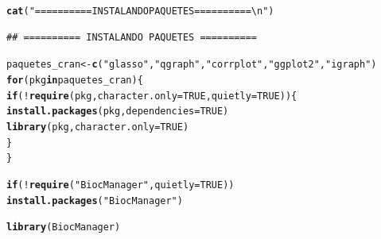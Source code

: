 \documentclass{article}\usepackage[]{graphicx}\usepackage[]{xcolor}
\makeatletter
\newcommand{\hlnum}[1]{\textcolor[rgb]{0.686,0.059,0.569}{#1}}%
\newcommand{\hlsng}[1]{\textcolor[rgb]{0.192,0.494,0.8}{#1}}%
\newcommand{\hlopt}[1]{\textcolor[rgb]{0,0,0}{#1}}%
\newcommand{\hldef}[1]{\textcolor[rgb]{0.345,0.345,0.345}{#1}}%
\newcommand{\hlkwa}[1]{\textcolor[rgb]{0.161,0.373,0.58}{\textbf{#1}}}%
\newcommand{\hlkwb}[1]{\textcolor[rgb]{0.69,0.353,0.396}{#1}}%
\newcommand{\hlkwc}[1]{\textcolor[rgb]{0.333,0.667,0.333}{#1}}%
\newcommand{\hlkwd}[1]{\textcolor[rgb]{0.737,0.353,0.396}{\textbf{#1}}}%
\newenvironment{kframe}{%
 \def\at@end@of@kframe{}%
 \ifinner\ifhmode%
  \def\at@end@of@kframe{\end{minipage}}%
  \begin{minipage}{\columnwidth}%
 \fi\fi%
 \def\FrameCommand##1{\hskip\@totalleftmargin \hskip-\fboxsep
 \colorbox{shadecolor}{##1}\hskip-\fboxsep
     \hskip-\linewidth \hskip-\@totalleftmargin \hskip\columnwidth}%
 \MakeFramed {\advance\hsize-\width
   \@totalleftmargin\z@ \linewidth\hsize
   \@setminipage}}%
 {\par\unskip\endMakeFramed%
 \at@end@of@kframe}
\newenvironment{knitrout}{}{} %
\makeatother
\begin{document}
\begin{knitrout}
\color{fgcolor}\begin{kframe}
\begin{alltt}
\hlkwd{cat}\hldef{(}\hlsng{"========== INSTALANDO PAQUETES ==========\textbackslash{}n"}\hldef{)}
\end{alltt}
\begin{verbatim}
## ========== INSTALANDO PAQUETES ==========
\end{verbatim}
\begin{alltt}
\hldef{paquetes_cran} \hlkwb{<-} \hlkwd{c}\hldef{(}\hlsng{"glasso"}\hldef{,} \hlsng{"qgraph"}\hldef{,} \hlsng{"corrplot"}\hldef{,} \hlsng{"ggplot2"}\hldef{,} \hlsng{"igraph"}\hldef{)}
\hlkwa{for}\hldef{(pkg} \hlkwa{in} \hldef{paquetes_cran) \{}
  \hlkwa{if}\hldef{(}\hlopt{!}\hlkwd{require}\hldef{(pkg,} \hlkwc{character.only} \hldef{=} \hlnum{TRUE}\hldef{,} \hlkwc{quietly} \hldef{=} \hlnum{TRUE}\hldef{)) \{}
    \hlkwd{install.packages}\hldef{(pkg,} \hlkwc{dependencies} \hldef{=} \hlnum{TRUE}\hldef{)}
    \hlkwd{library}\hldef{(pkg,} \hlkwc{character.only} \hldef{=} \hlnum{TRUE}\hldef{)}
  \hldef{\}}
\hldef{\}}
\end{alltt}


{\ttfamily\noindent\itshape\color{messagecolor}{\#\# corrplot 0.95 loaded}}

{\ttfamily\noindent\itshape\color{messagecolor}{\#\# \\\#\# Attaching package: 'igraph'}}

{\ttfamily\noindent\itshape\color{messagecolor}{\#\# The following objects are masked from 'package:stats':\\\#\# \\\#\# \ \ \ \ decompose, spectrum}}

{\ttfamily\noindent\itshape\color{messagecolor}{\#\# The following object is masked from 'package:base':\\\#\# \\\#\# \ \ \ \ union}}\begin{alltt}
\hlkwa{if} \hldef{(}\hlopt{!}\hlkwd{require}\hldef{(}\hlsng{"BiocManager"}\hldef{,} \hlkwc{quietly} \hldef{=} \hlnum{TRUE}\hldef{))}
  \hlkwd{install.packages}\hldef{(}\hlsng{"BiocManager"}\hldef{)}
\end{alltt}


{\ttfamily\noindent\color{warningcolor}{\#\# Warning: package 'BiocManager' was built under R version 4.5.2}}

{\ttfamily\noindent\itshape\color{messagecolor}{\#\# Bioconductor version 3.22 (BiocManager 1.30.27), R 4.5.1 (2025-06-13)}}\begin{alltt}
\hlkwd{library}\hldef{(BiocManager)}


\end{alltt}
\end{kframe}
\end{knitrout}
\end{document}
